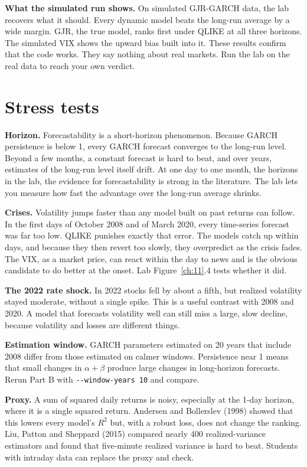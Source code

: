 \textbf{What the simulated run shows.} On simulated GJR-GARCH data, the lab recovers what it should. Every dynamic model beats the long-run average by a wide margin. GJR, the true model, ranks first under QLIKE at all three horizons. The simulated VIX shows the upward bias built into it. These results confirm that the code works. They say nothing about real markets. Run the lab on the real data to reach your own verdict.

\section{Stress tests}
\label{sec:11-stress}

\textbf{Horizon.} Forecastability is a short-horizon phenomenon. Because GARCH persistence is below 1, every GARCH forecast converges to the long-run level. Beyond a few months, a constant forecast is hard to beat, and over years, estimates of the long-run level itself drift. At one day to one month, the horizons in the lab, the evidence for forecastability is strong in the literature. The lab lets you measure how fast the advantage over the long-run average shrinks.

\textbf{Crises.} Volatility jumps faster than any model built on past returns can follow. In the first days of October 2008 and of March 2020, every time-series forecast was far too low. QLIKE punishes exactly that error. The models catch up within days, and because they then revert too slowly, they overpredict as the crisis fades. The VIX, as a market price, can react within the day to news and is the obvious candidate to do better at the onset. Lab Figure~\ref{ch:11}.4 tests whether it did.

\textbf{The 2022 rate shock.} In 2022 stocks fell by about a fifth, but realized volatility stayed moderate, without a single spike. This is a useful contrast with 2008 and 2020. A model that forecasts volatility well can still miss a large, slow decline, because volatility and losses are different things.

\textbf{Estimation window.} GARCH parameters estimated on 20 years that include 2008 differ from those estimated on calmer windows. Persistence near 1 means that small changes in $\alpha + \beta$ produce large changes in long-horizon forecasts. Rerun Part B with \texttt{-{}-window-years 10} and compare.

\textbf{Proxy.} A sum of squared daily returns is noisy, especially at the 1-day horizon, where it is a single squared return. Andersen and Bollerslev (1998) showed that this lowers every model's $R^2$ but, with a robust loss, does not change the ranking. Liu, Patton and Sheppard (2015) compared nearly 400 realized-variance estimators and found that five-minute realized variance is hard to beat. Students with intraday data can replace the proxy and check.

